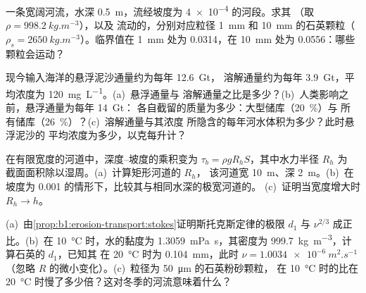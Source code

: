 \begin{exercise}[$\star$]\label{exo:b1:erosion-transport:3}
一条宽阔河流，水深 \qty{0.5}{m}，流经坡度为 \num{4e-4} 的河段。求其
（取 $\rho = \qty{998.2}{kg.m^{-3}}$），以及
流动的，分别对应粒径 \qty{1}{mm} 和
\qty{10}{mm} 的石英颗粒（$\rho_s = \qty{2650}{kg.m^{-3}}$）。临界值在
\qty{1}{mm} 处为 \num{0.0314}，在 \qty{10}{mm} 处为 \num{0.0556}：哪些颗粒会运动？
\end{exercise}

\begin{exercise}[$\star$]\label{exo:b1:erosion-transport:4}
现今输入海洋的悬浮泥沙通量约为每年 \qty{12.6}{Gt}，
溶解通量约为每年 \qty{3.9}{Gt}，平均浓度为
\qty{120}{mg.L^{-1}}。(a)~悬浮通量与
溶解通量之比是多少？(b)~人类影响之前，悬浮通量为每年 \qty{14}{Gt}：
各自截留的质量为多少：大型储库（\qty{20}{\percent}）与
所有储库（\qty{26}{\percent}）？(c)~溶解通量与其浓度
所隐含的每年河水体积为多少？此时悬浮泥沙的
平均浓度为多少，以克每升计？
\end{exercise}

\begin{exercise}[$\star\star$]\label{exo:b1:erosion-transport:5}
在有限宽度的河道中，深度–坡度的乘积变为 $\tau_b =
\rho g R_h S$，其中水力半径 $R_h$ 为
截面面积除以湿周。(a)~计算矩形河道的 $R_h$，
该河道宽 \qty{10}{m}、深 \qty{2}{m}。(b)~在坡度为
\num{0.001} 的情形下，比较其与相同水深的极宽河道的。
(c)~证明当宽度增大时 $R_h \to h$。
\end{exercise}

\begin{exercise}[$\star\star$]\label{exo:b1:erosion-transport:6}
(a)~由\cref{prop:b1:erosion-transport:stokes}证明斯托克斯定律的极限 $d_1$
与 $\nu^{2/3}$ 成正比。(b)~在 \qty{10}{\celsius} 时，水的黏度为
\qty{1.3059}{mPa.s}，其密度为
\qty{999.7}{kg.m^{-3}}，计算石英的 $d_1$，已知其
在 \qty{20}{\celsius} 时为 \qty{0.104}{mm}，此时 $\nu = \qty{1.0034e-6}{m^2.s^{-1}}$
（忽略 $R$ 的微小变化）。(c)~粒径为 \qty{50}{\micro m} 的石英粉砂颗粒，
在 \qty{10}{\celsius} 时的比在
\qty{20}{\celsius} 时慢了多少倍？这对冬季的河流意味着什么？
\end{exercise}

